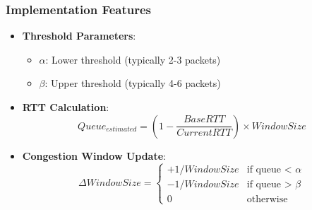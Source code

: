 \documentclass[11pt,a4paper]{article}
\begin{document}
\begin{tcolorbox}[
    enhanced,
    colback=white,
    colframe=blue!75!black,
    title=Algorithm Implementation Details]
\subsubsection{Implementation Features}
\begin{itemize}
    \item \textbf{Threshold Parameters}:
    \begin{itemize}
        \item $\alpha$: Lower threshold (typically 2-3 packets)
        \item $\beta$: Upper threshold (typically 4-6 packets)
    \end{itemize}
    
    \item \textbf{RTT Calculation}:
    \begin{equation}
        Queue_{estimated} = \left(1 - \frac{BaseRTT}{CurrentRTT}\right) \times WindowSize
    \end{equation}
    
    \item \textbf{Congestion Window Update}:
    \[
    \Delta WindowSize = 
    \begin{cases}
        +1/WindowSize & \text{if queue < } \alpha \\
        -1/WindowSize & \text{if queue > } \beta \\
        0 & \text{otherwise}
    \end{cases}
    \]
\end{itemize}
\end{tcolorbox}
\end{document}

